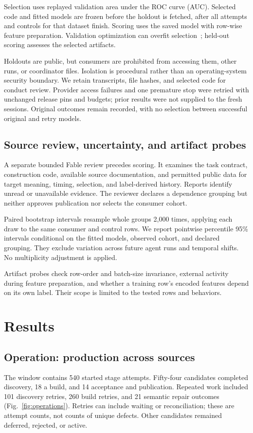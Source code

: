 \documentclass[conference,10pt,letterpaper]{IEEEtran}
\begin{document}
Selection uses replayed validation area under the ROC curve (AUC). Selected code and fitted models are frozen before the holdout is fetched, after all attempts and controls for that dataset finish. Scoring uses the saved model with row-wise feature preparation. Validation optimization can overfit selection~\cite{cawley}; held-out scoring assesses the selected artifacts.

Holdouts are public, but consumers are prohibited from accessing them, other runs, or coordinator files. Isolation is procedural rather than an operating-system security boundary. We retain transcripts, file hashes, and selected code for conduct review. Provider access failures and one premature stop were retried with unchanged release pins and budgets; prior results were not supplied to the fresh sessions. Original outcomes remain recorded, with no selection between successful original and retry models.

\subsection{Source review, uncertainty, and artifact probes}
A separate bounded Fable review precedes scoring. It examines the task contract, construction code, available source documentation, and permitted public data for target meaning, timing, selection, and label-derived history. Reports identify unread or unavailable evidence. The reviewer declares a dependence grouping but neither approves publication nor selects the consumer cohort.

Paired bootstrap intervals resample whole groups 2,000 times, applying each draw to the same consumer and control rows. We report pointwise percentile 95\% intervals conditional on the fitted models, observed cohort, and declared grouping. They exclude variation across future agent runs and temporal shifts. No multiplicity adjustment is applied.

Artifact probes check row-order and batch-size invariance, external activity during feature preparation, and whether a training row's encoded features depend on its own label. Their scope is limited to the tested rows and behaviors.

\section{Results}
\subsection{Operation: production across sources}
The window contains 540 started stage attempts. Fifty-four candidates completed discovery, 18 a build, and 14 acceptance and publication. Repeated work included 101 discovery retries, 260 build retries, and 21 semantic repair outcomes (Fig.~\ref{fig:operations}). Retries can include waiting or reconciliation; these are attempt counts, not counts of unique defects. Other candidates remained deferred, rejected, or active.
\end{document}
